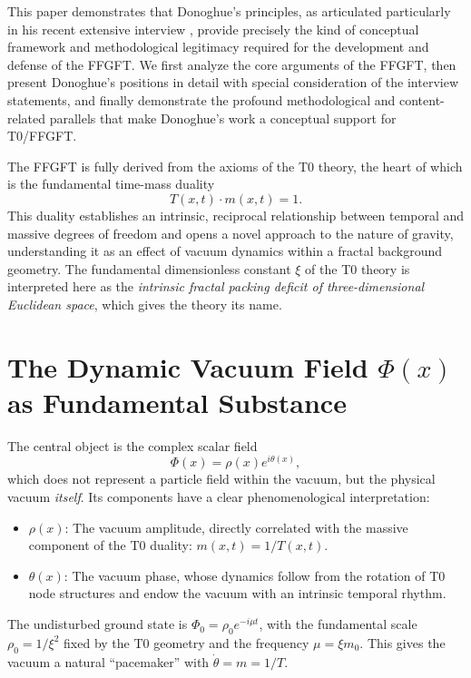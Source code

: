 	This paper demonstrates that Donoghue's principles, as articulated particularly in his recent extensive interview \cite{DonoghueInterview2025}, provide precisely the kind of conceptual framework and methodological legitimacy required for the development and defense of the FFGFT. We first analyze the core arguments of the FFGFT, then present Donoghue's positions in detail with special consideration of the interview statements, and finally demonstrate the profound methodological and content-related parallels that make Donoghue's work a conceptual support for T0/FFGFT.
	
	
	The FFGFT is fully derived from the axioms of the T0 theory, the heart of which is the fundamental time-mass duality
	\[
	T(x,t) \cdot m(x,t) = 1.
	\]
	This duality establishes an intrinsic, reciprocal relationship between temporal and massive degrees of freedom and opens a novel approach to the nature of gravity, understanding it as an effect of vacuum dynamics within a fractal background geometry. The fundamental dimensionless constant $\xi$ of the T0 theory is interpreted here as the \emph{intrinsic fractal packing deficit of three-dimensional Euclidean space}, which gives the theory its name.
	
\section{The Dynamic Vacuum Field \texorpdfstring{$\Phi(x)$}{Phi(x)} as Fundamental Substance}
	
	The central object is the complex scalar field
	\[
	\Phi(x) = \rho(x) e^{i\theta(x)},
	\]
	which does not represent a particle field within the vacuum, but the physical vacuum \emph{itself}. Its components have a clear phenomenological interpretation:
	\begin{itemize}
		\item $\rho(x)$: The vacuum amplitude, directly correlated with the massive component of the T0 duality: $m(x,t) = 1/T(x,t)$.
		\item $\theta(x)$: The vacuum phase, whose dynamics follow from the rotation of T0 node structures and endow the vacuum with an intrinsic temporal rhythm.
	\end{itemize}
	
	The undisturbed ground state is $\Phi_0 = \rho_0 e^{-i\mu t}$, with the fundamental scale $\rho_0 = 1/\xi^2$ fixed by the T0 geometry and the frequency $\mu = \xi m_0$. This gives the vacuum a natural ``pacemaker'' with $\dot{\theta} = m = 1/T$.
	
